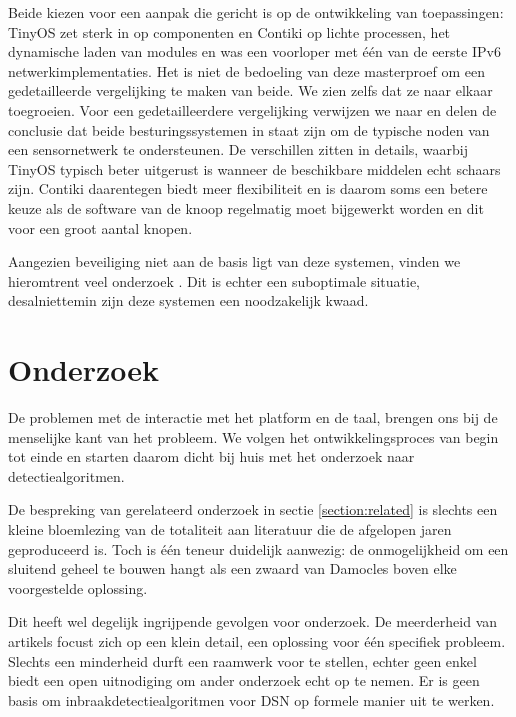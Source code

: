 Beide kiezen voor een aanpak die gericht is op de ontwikkeling van
toepassingen: TinyOS zet sterk in op componenten en Contiki op lichte
processen, het dynamische laden van modules en was een voorloper met \'e\'en
van de eerste IPv6 netwerkimplementaties. Het is niet de bedoeling van deze
masterproef om een gedetailleerde vergelijking te maken van beide. We zien
zelfs dat ze naar elkaar toegroeien. Voor een gedetailleerdere vergelijking
verwijzen we naar \citep{reusing2012comparison} en delen de conclusie dat beide
besturingssystemen in staat zijn om de typische noden van een sensornetwerk te
ondersteunen. De verschillen zitten in details, waarbij TinyOS typisch beter
uitgerust is wanneer de beschikbare middelen echt schaars zijn. Contiki
daarentegen biedt meer flexibiliteit en is daarom soms een betere keuze als de
software van de knoop regelmatig moet bijgewerkt worden en dit voor een groot
aantal knopen.

Aangezien beveiliging niet aan de basis ligt van deze systemen, vinden we
hieromtrent veel onderzoek \citep{paul2009safe, casado2009contikisec,
karlof2004tinysec}. Dit is echter een suboptimale situatie, desalniettemin zijn
deze systemen een noodzakelijk kwaad.

\section{Onderzoek}
\label{section:problem-research}

De problemen met de interactie met het platform en de taal, brengen ons bij de
menselijke kant van het probleem. We volgen het ontwikkelingsproces van begin
tot einde en starten daarom dicht bij huis met het onderzoek naar
detectiealgoritmen.

De bespreking van gerelateerd onderzoek in sectie \ref{section:related} is
slechts een kleine bloemlezing van de totaliteit aan literatuur die de
afgelopen jaren geproduceerd is. Toch is \'e\'en teneur duidelijk aanwezig: de
onmogelijkheid om een sluitend geheel te bouwen hangt als een zwaard van
Damocles boven elke voorgestelde oplossing.

Dit heeft wel degelijk ingrijpende gevolgen voor onderzoek. De meerderheid van
artikels focust zich op een klein detail, een oplossing voor \'e\'en specifiek
probleem. Slechts een minderheid durft een raamwerk voor te stellen, echter
geen enkel biedt een open uitnodiging om ander onderzoek echt op te nemen. Er
is geen basis om inbraakdetectiealgoritmen voor DSN op formele manier uit te
werken.

